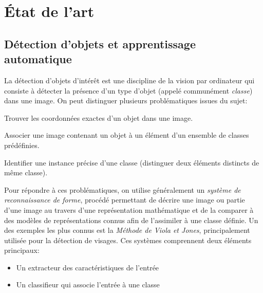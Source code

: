 	\section{État de l'art}

		\subsection{Détection d'objets et apprentissage automatique}
			
			La détection d'objets d'intérêt est une discipline de la vision par ordinateur qui consiste à détecter la présence d'un type d'objet (appelé communément \emph{classe}) dans une image. On peut distinguer plusieurs problématiques issues du sujet:
			\begin{description}[noitemsep]
				\item[Localisation:] Trouver les coordonnées exactes d'un objet dans une image.
				\item[Classification:] Associer une image contenant un objet à un élément d'un ensemble de classes prédéfinies.
				\item[Reconnaissance:] Identifier une instance précise d'une classe (distinguer deux éléments distincts de même classe).
			\end{description}
			Pour répondre à ces problématiques, on utilise généralement un \emph{système de reconnaissance de forme}, procédé permettant de décrire une image ou partie d'une image au travers d'une représentation mathématique et de la comparer à des modèles de représentations connus afin de l'assimiler à une classe définie. Un des exemples les plus connus est la \emph{Méthode de Viola et Jones}\cite{viola}, principalement utilisée pour la détection de visages. Ces systèmes comprennent deux éléments principaux:
			\begin{itemize}[noitemsep]
				\item Un extracteur des caractéristiques de l'entrée
				\item Un classifieur qui associe l'entrée à une classe
			\end{itemize}
			\par
